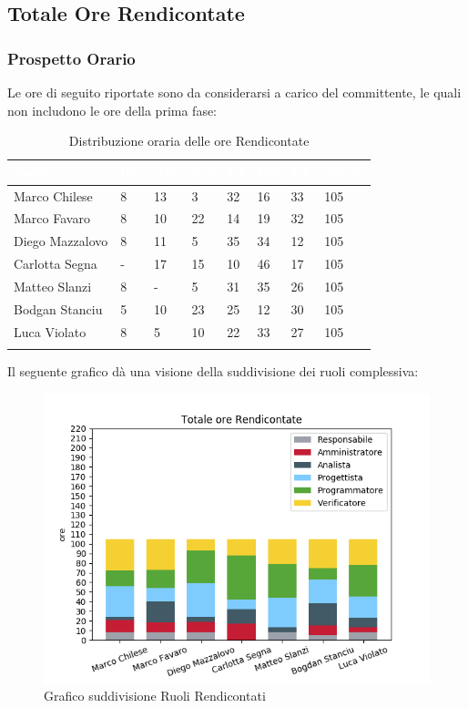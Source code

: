 \newpage
\subsection{Totale Ore Rendicontate}
\label{PTRR}
\subsubsection{Prospetto Orario}

Le ore di seguito riportate sono da considerarsi a carico del committente, le quali non includono le ore della prima fase:

\begin{longtable}{|C{.30\textwidth}|C{.06\textwidth}|C{.06\textwidth}|C{.06\textwidth} | C{.06\textwidth}| C{.06\textwidth} | C{.06\textwidth} | C{.10\textwidth} |}
\hline
{}	\textbf{\textcolor{white}{Nome}} & \textbf{\textcolor{white}{RE}} & \textbf{\textcolor{white}{AM}} & \textbf{\textcolor{white}{AN}} & \textbf{\textcolor{white}{PJ}} & \textbf{\textcolor{white}{PR}} & \textbf{\textcolor{white}{VE}} & \textbf{\textcolor{white}{Totale}}\\
\hline 
Marco Chilese & 8 & 13 & 3 & 32 & 16 & 33 & 105\\
\hline
{}Marco Favaro & 8 & 10 & 22 & 14 & 19 & 32 & 105\\
\hline
Diego Mazzalovo & 8 & 11 & 5 & 35 & 34 & 12 & 105\\
\hline
{}Carlotta Segna & - & 17 & 15 & 10 & 46 & 17 & 105\\
\hline
Matteo Slanzi & 8 & - & 5 & 31 & 35 & 26 & 105\\
\hline
{}Bodgan Stanciu & 5 & 10 & 23 & 25 & 12 & 30 & 105\\
\hline
Luca Violato & 8 & 5 & 10 & 22 & 33 & 27 & 105 \\
\hline

\caption{Distribuzione oraria delle ore Rendicontate}
\label{Distribuzione oraria delle ore rendicontate}
\end{longtable}

Il seguente grafico dà una visione della suddivisione dei ruoli complessiva:

\begin{figure}[H]
	\centering
  		\includegraphics[width=0.8\linewidth]{./images/fig_tor.png}
  		\caption{Grafico suddivisione Ruoli Rendicontati}
  		\label{fig:grafico suddivione ruoli}
\end{figure}

